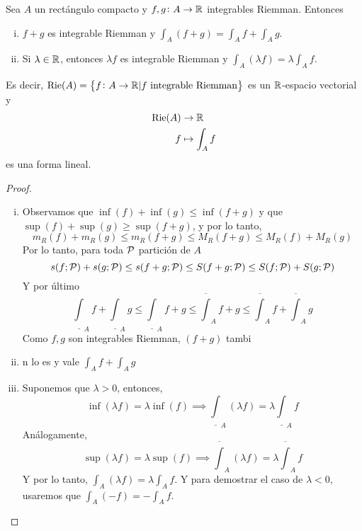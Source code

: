 \begin{prop}[Linealidad]\label{prop:lin_int}
    Sea $A$ un rectángulo compacto y $f,g \colon A \to \mathbb{R}$ integrables Riemman.
    Entonces
    \begin{enumerate}[i)]
        \item $f+g$ es integrable Riemman y $\int_A (f+g) = \int_A f+\int_A g$.
        \item Si $\lambda \in \mathbb{R}$, entonces $\lambda f$ es integrable
            Riemman y $\int_A (\lambda f) = \lambda \int_A f$.
    \end{enumerate}

    Es decir, $\text{Rie}(A) = \left\{f \colon A \to \mathbb{R} \vert f \text{ integrable
    Riemman}\right\}$ es un $\mathbb{R}$-espacio vectorial y
    \[
        \begin{aligned}
            \text{Rie}(A) &\to \mathbb{R} \\ f &\mapsto \int_A f
        \end{aligned}
    \]
    es una forma lineal.
\end{prop}
\begin{proof}
    \begin{enumerate}[i)]
        \item Observamos que $\inf(f) + \inf(g) \leq \inf(f+g)$ y que
            $\sup(f)+\sup(g) \geq \sup(f+g)$, y por lo tanto,
            \[
                m_R(f) + m_R(g) \leq m_R(f+g) \leq M_R(f+g) \leq
                M_R(f) + M_R(g)
            \]
            Por lo tanto, para toda $\mathcal{P}$ partición de $A$
            \[
                s(f;\mathcal{P}) + s(g;\mathcal{P}) \leq s(f+g;\mathcal{P}) \leq S(f+g;\mathcal{P})
                \leq S(f;\mathcal{P}) + S(g;\mathcal{P})
            \]
            Y por último
            \[
                \underline{\int}_A f + \underline{\int}_A g \leq
                \underline{\int}_A f+g \leq \overline{\int}_A f+g \leq
                \overline{\int}_A f + \overline{\int}_A g
            \]
            Como $f,g$ son integrables Riemman, $(f+g)$ tambi\item n lo es
            y vale $\int_A f + \int_A g$
        \item Suponemos que $\lambda > 0$, entonces,
            \[
                \inf (\lambda f) = \lambda \inf (f) \implies
                \underline{\int}_A (\lambda f) = \lambda
                \underline{\int}_A f
            \]
            Análogamente,
            \[
                \sup(\lambda f) = \lambda \sup(f) \implies
                \overline{\int}_A (\lambda f) = \lambda
                \overline{\int}_A f
            \]
            Y por lo tanto, $\int_A (\lambda f) = \lambda \int_A f$.
            Y para demostrar el caso de $\lambda < 0$, usaremos que
            $\int_A (-f) = - \int_A f$.
    \end{enumerate}
\end{proof}

